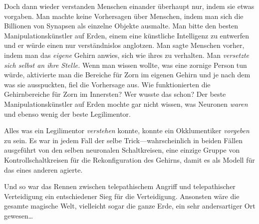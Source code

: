 Doch dann wieder verstanden Menschen einander überhaupt nur, indem sie etwas vorgaben. Man machte keine Vorhersagen über Menschen, indem man sich die Billionen von Synapsen als einzelne Objekte ausmalte. Man bitte den besten Manipulationskünstler auf Erden, einem eine künstliche Intelligenz zu entwerfen und er würde einen nur verständnislos anglotzen. Man sagte Menschen vorher, indem man das \emph{eigene} Gehirn anwies, sich wie ihres zu verhalten. Man \emph{versetzte sich selbst an ihre Stelle.} Wenn man wissen wollte, was eine zornige Person tun würde, aktivierte man die Bereiche für Zorn im eigenen Gehirn und je nach dem was sie ausspuckten, fiel die Vorhersage aus. Wie funktionierten die Gehirnbereiche für Zorn im Innersten? Wer wusste das schon? Der beste Manipulationskünstler auf Erden mochte gar nicht wissen, was Neuronen \emph{waren} und ebenso wenig der beste Legilimentor.

Alles was ein Legilimentor \emph{verstehen} konnte, konnte ein Okklumentiker \emph{vorgeben} zu sein. Es war in jedem Fall der selbe Trick—wahrscheinlich in beiden Fällen ausgeführt von den selben neuronalen Schaltkreisen, eine einzige Gruppe von Kontrollschaltkreisen für die Rekonfiguration des Gehirns, damit es als Modell für das eines anderen agierte.

Und so war das Rennen zwischen telepathischem Angriff und telepathischer Verteidigung ein entschiedener Sieg für die Verteidigung. Ansonsten wäre die gesamte magische Welt, vielleicht sogar die ganze Erde, ein sehr andersartiger Ort gewesen…

